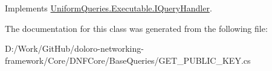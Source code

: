 Implements \mbox{\hyperlink{interface_uniform_queries_1_1_executable_1_1_i_query_handler_a0f43184bf3e306a7cbebc39098f044ee}{Uniform\+Queries.\+Executable.\+I\+Query\+Handler}}.



The documentation for this class was generated from the following file\+:\begin{DoxyCompactItemize}
\item 
D\+:/\+Work/\+Git\+Hub/doloro-\/networking-\/framework/\+Core/\+D\+N\+F\+Core/\+Base\+Queries/G\+E\+T\+\_\+\+P\+U\+B\+L\+I\+C\+\_\+\+K\+E\+Y.\+cs\end{DoxyCompactItemize}
